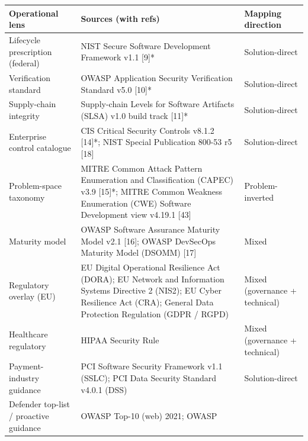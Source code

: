 \documentclass[
]{article}
\begin{document}
\begin{longtable}[]{@{}
  >{\raggedright\arraybackslash}p{}
  >{\raggedright\arraybackslash}p{}
  >{\raggedright\arraybackslash}p{}@{}}
\toprule\noalign{}
\begin{minipage}[b]{\linewidth}\raggedright
Operational lens
\end{minipage} & \begin{minipage}[b]{\linewidth}\raggedright
Sources (with refs)
\end{minipage} & \begin{minipage}[b]{\linewidth}\raggedright
Mapping direction
\end{minipage} \\
\midrule\noalign{}
\endhead
\bottomrule\noalign{}
\endlastfoot
Lifecycle prescription (federal) & NIST Secure Software Development
Framework v1.1 {[}9{]}* & Solution-direct \\
Verification standard & OWASP Application Security Verification Standard
v5.0 {[}10{]}* & Solution-direct \\
Supply-chain integrity & Supply-chain Levels for Software Artifacts
(SLSA) v1.0 build track {[}11{]}* & Solution-direct \\
Enterprise control catalogue & CIS Critical Security Controls v8.1.2
{[}14{]}*; NIST Special Publication 800-53 r5 {[}18{]} &
Solution-direct \\
Problem-space taxonomy & MITRE Common Attack Pattern Enumeration and
Classification (CAPEC) v3.9 {[}15{]}*; MITRE Common Weakness Enumeration
(CWE) Software Development view v4.19.1 {[}43{]} & Problem-inverted \\
Maturity model & OWASP Software Assurance Maturity Model v2.1 {[}16{]};
OWASP DevSecOps Maturity Model (DSOMM) {[}17{]} & Mixed \\
Regulatory overlay (EU) & EU Digital Operational Resilience Act (DORA);
EU Network and Information Systems Directive 2 (NIS2); EU Cyber
Resilience Act (CRA); General Data Protection Regulation (GDPR / RGPD) &
Mixed (governance + technical) \\
Healthcare regulatory & HIPAA Security Rule & Mixed (governance +
technical) \\
Payment-industry guidance & PCI Software Security Framework v1.1 (SSLC);
PCI Data Security Standard v4.0.1 (DSS) & Solution-direct \\
Defender top-list / proactive guidance & OWASP Top-10 (web) 2021; OWASP

\end{longtable}
\end{document}
